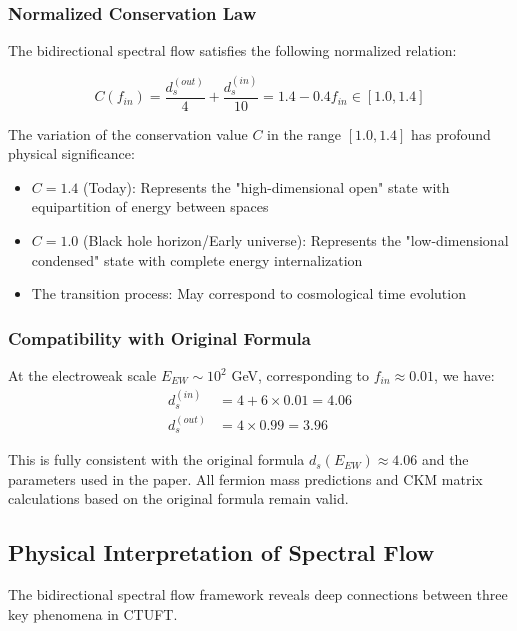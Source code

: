 \subsubsection{Normalized Conservation Law}

The bidirectional spectral flow satisfies the following normalized relation:

\begin{equation}
C(f_{in}) = \frac{d_s^{(out)}}{4} + \frac{d_s^{(in)}}{10} = 1.4 - 0.4f_{in} \in [1.0, 1.4]
\label{eq:normalized_conservation}
\end{equation}

The variation of the conservation value $C$ in the range $[1.0, 1.4]$ has profound physical significance:
\begin{itemize}
    \item $C = 1.4$ (Today): Represents the "high-dimensional open" state with equipartition of energy between spaces
    \item $C = 1.0$ (Black hole horizon/Early universe): Represents the "low-dimensional condensed" state with complete energy internalization
    \item The transition process: May correspond to cosmological time evolution
\end{itemize}

\subsubsection{Compatibility with Original Formula}

At the electroweak scale $E_{EW} \sim 10^2$ GeV, corresponding to $f_{in} \approx 0.01$, we have:
\begin{align}
d_s^{(in)} &= 4 + 6 \times 0.01 = 4.06 \\
d_s^{(out)} &= 4 \times 0.99 = 3.96
\end{align}

This is fully consistent with the original formula $d_s(E_{EW}) \approx 4.06$ and the parameters used in the paper. All fermion mass predictions and CKM matrix calculations based on the original formula remain valid.

\subsection{Physical Interpretation of Spectral Flow}
\label{sec:spectral_interpretation}

The bidirectional spectral flow framework reveals deep connections between three key phenomena in CTUFT.

